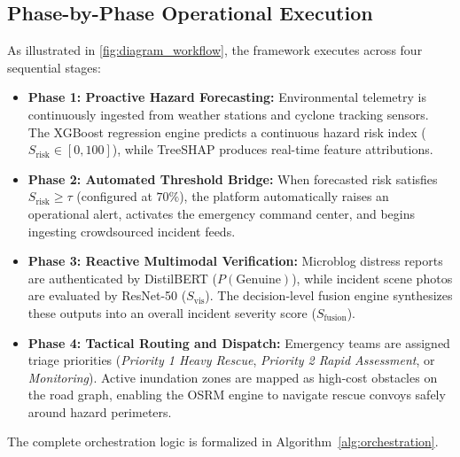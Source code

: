 \documentclass{article}
\begin{document}
\subsection{Phase-by-Phase Operational Execution}
As illustrated in \cref{fig:diagram_workflow}, the framework executes across four sequential stages:
\begin{itemize}
    \item \textbf{Phase 1: Proactive Hazard Forecasting:} Environmental telemetry is continuously ingested from weather stations and cyclone tracking sensors. The XGBoost regression engine predicts a continuous hazard risk index ($S_{\text{risk}} \in [0, 100]$), while TreeSHAP produces real-time feature attributions.
    \item \textbf{Phase 2: Automated Threshold Bridge:} When forecasted risk satisfies $S_{\text{risk}} \ge \tau$ (configured at $70\%$), the platform automatically raises an operational alert, activates the emergency command center, and begins ingesting crowdsourced incident feeds.
    \item \textbf{Phase 3: Reactive Multimodal Verification:} Microblog distress reports are authenticated by DistilBERT ($P(\text{Genuine})$), while incident scene photos are evaluated by ResNet-50 ($S_{\text{vis}}$). The decision-level fusion engine synthesizes these outputs into an overall incident severity score ($S_{\text{fusion}}$).
    \item \textbf{Phase 4: Tactical Routing and Dispatch:} Emergency teams are assigned triage priorities (\textit{Priority 1 Heavy Rescue}, \textit{Priority 2 Rapid Assessment}, or \textit{Monitoring}). Active inundation zones are mapped as high-cost obstacles on the road graph, enabling the OSRM engine to navigate rescue convoys safely around hazard perimeters.
\end{itemize}

The complete orchestration logic is formalized in Algorithm~\ref{alg:orchestration}.
\end{document}
